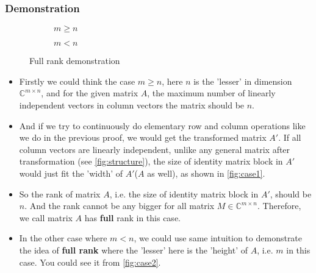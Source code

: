 \subsubsection*{Demonstration}
\begin{figure}[H]
  \centering
  \captionsetup[subfigure]{justification=centering}
  \begin{subfigure}[b]{0.5\textwidth}
    \centering
    \caption{$m \ge n$}
    \label{fig:case1}
    \end{subfigure}
    \hfill
    \begin{subfigure}[b]{0.4\textwidth}
      \centering
      \caption{$m < n$}
      \label{fig:case2}
    \end{subfigure}
    \caption{Full rank demonstration}
\end{figure}
\begin{itemize}
  \item Firstly we could think the case $m \ge n$, here $n$ is the 'lesser' in dimension $\mathbb{C}^{m \times n}$, and for the given matrix $A$, the maximum number of linearly independent vectors in column vectors the matrix should be $n$. 
  \item And if we try to continuously do elementary row and column operations like we do in the previous proof, we would get the transformed matrix $A'$. If all column vectors are linearly independent, unlike any general matrix after transformation (see \autoref{fig:structure}), the size of identity matrix block in $A'$ would just fit the 'width' of $A'$($A$ as well), as shown in \autoref{fig:case1}. 
  \item So the rank of matrix $A$, i.e. the size of identity matrix block in $A'$, should be $n$. And the rank cannot be any bigger for all matrix $M \in \mathbb{C}^{m \times n}$. Therefore, we call matrix $A$ has \textbf{full} rank in this case.
  \item In the other case where $m < n$, we could use same intuition to demonstrate the idea of  \textbf{full rank} where the 'lesser' here is the 'height' of $A$, i.e.  $m$ in this case. You could see it from \autoref{fig:case2}.
\end{itemize}
